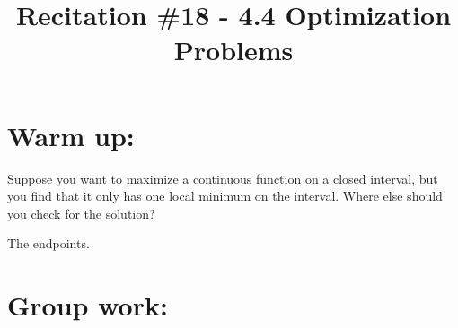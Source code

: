 \documentclass[handout,nooutcomes]{ximera}
\title{Recitation \#18 - 4.4 Optimization Problems}
\begin{document}
\begin{abstract}		\end{abstract}
\maketitle

\section*{Warm up:} 
Suppose you want to maximize a continuous function on a closed interval, but you find that it only has one local minimum on the interval.  Where else should you check for the solution?  
		\begin{freeResponse}
		The endpoints.
		\end{freeResponse}	
		
		
		

	
	
	
	
	

\section*{Group work:}
\end{document}
